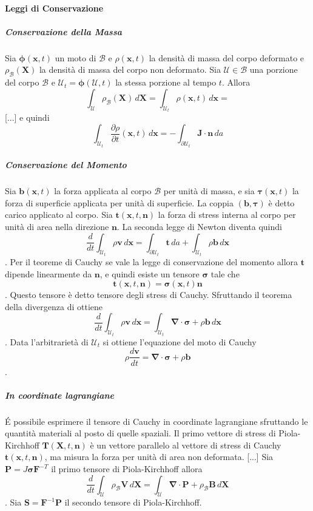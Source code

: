 \documentclass{book}
\newcommand{\Nabla}{\boldsymbol{\nabla}}
\begin{document}
\paragraph{Leggi di Conservazione}
\subparagraph{Conservazione della Massa}
Sia $\boldsymbol{\phi}(\mathbf{x},t)$ un moto di $\mathcal{B}$ e $\rho(\mathbf{x},t)$ la densità di massa del corpo deformato e $\rho_{\mathcal{B}}(\mathbf{X})$ la densità di massa del corpo non deformato. 
Sia $\mathcal{U}\in\mathcal{B}$ una porzione del corpo $\mathcal{B}$ e  $\mathcal{U}_t=\boldsymbol{\phi}(\mathcal{U},t)$ la stessa porzione al tempo $t$. Allora 
$$\int_{\mathcal{U}}\rho_{\mathcal{B}}(\mathbf{X})\, d\mathbf{X} = \int_{\mathcal{U}_t}\rho(\mathbf{x},t)\, d\mathbf{x} = $$
[...] e quindi
$$\int_{\mathcal{U}_t}\frac{\partial\rho}{\partial t}(\mathbf{x},t)\, d\mathbf{x} =  -\int_{\partial\mathcal{U}_t} \mathbf{J} \cdot \mathbf{n} \, da$$
\subparagraph{Conservazione del Momento}
Sia $\mathbf{b}(\mathbf{x},t)$ la forza applicata al corpo $\mathcal{B}$ per unità di massa, e sia $\boldsymbol{\tau}(\mathbf{x},t)$ la forza di superficie applicata per unità di superficie. La coppia $(\mathbf{b},\boldsymbol{\tau})$ è detto carico applicato al corpo. Sia $\mathbf{t}(\mathbf{x},t,\mathbf{n})$ la forza di stress interna al corpo per unità di area nella direzione $\mathbf{n}$. La seconda legge di Newton diventa quindi
$$\frac{d}{dt}\int_{\mathcal{U}_t}\rho\mathbf{v}\, d\mathbf{x} = \int_{\partial \mathcal{U}_t}\mathbf{t}\, da + \int_{\mathcal{U}_t}\rho\mathbf{b}\, d\mathbf{x} $$.
Per il teoreme di Cauchy se vale la legge di conservazione del momento allora $\mathbf{t}$ dipende linearmente da  $\mathbf{n}$, e quindi esiste un tensore $\boldsymbol{\sigma}$ tale che 
$$\mathbf{t}(\mathbf{x},t,\mathbf{n})= \boldsymbol{\sigma}(\mathbf{x},t)\mathbf{n}$$. Questo tensore è detto tensore degli stress di Cauchy. Sfruttando il teorema della divergenza di ottiene
$$\frac{d}{dt}\int_{\mathcal{U}_t}\rho\mathbf{v}\, d\mathbf{x} = \int_{\mathcal{U}_t}\Nabla\cdot\boldsymbol{\sigma}+\rho\mathbf{b}\, d\mathbf{x} $$.
Data l'arbitrarietà di ${\mathcal{U}_t}$ si ottiene l'equazione del moto di Cauchy
$$\rho\frac{d\mathbf{v}}{dt}=\Nabla\cdot\boldsymbol{\sigma}+\rho\mathbf{b}$$. 
\subparagraph{In coordinate lagrangiane}
\'E possibile esprimere il tensore di Cauchy in coordinate lagrangiane sfruttando le quantità materiali al posto di quelle spaziali.
Il primo vettore di stress di Piola-Kirchhoff $\mathbf{T}(\mathbf{X},t,\mathbf{n})$ è un vettore parallelo al vettore di stress di Cauchy $\mathbf{t}(\mathbf{x},t,\mathbf{n})$, ma misura la forza per unità di area non deformata.
[...]
Sia $\mathbf{P}=J\boldsymbol{\sigma}\mathbf{F}^{-T}$ il primo tensore di Piola-Kirchhoff allora
$$\frac{d}{dt}\int_{\mathcal{U}}\rho_{\mathcal{B}}\mathbf{V}\, d\mathbf{X} = \int_\mathcal{U}\Nabla\cdot\mathbf{P}+\rho_{\mathcal{B}}\mathbf{B}\, d\mathbf{X} $$.
Sia $\mathbf{S}=\mathbf{F}^{-1}\mathbf{P}$ il secondo tensore di Piola-Kirchhoff.
\end{document}
